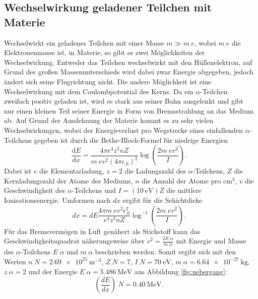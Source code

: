 \subsection{Wechselwirkung geladener Teilchen mit Materie}
\noindent Wechselwirkt ein geladenes Teilchen mit einer Masse $m\gg m_.e$, wobei $m_.e$ die Elektronenmasse ist, in Materie, so gibt es zwei Möglichkeiten der Wechselwirkung.
Entweder das Teilchen wechselwirkt mit den Hüllenelektron, auf Grund des großen Massenunterschieds wird dabei zwar Energie abgegeben, jedoch ändert sich seine Flugrichtung nicht. Die andere Möglichkeit ist eine Wechselwirkung mit dem Coulombpotential des Kerns. Da ein $\alpha$-Teilchen zweifach positiv geladen ist, wird es stark aus seiner Bahn ausgelenkt und gibt nur einen kleinen Teil seiner Energie in Form von Bremsstrahlung an das Medium ab.
Auf Grund der Ausdehnung der Materie kommt es zu sehr vielen Wechselwirkungen, wobei der Energieverlust pro Wegstrecke eines einfallenden $\alpha$-Teilchens gegeben ist durch die Bethe-Bloch-Formel für niedrige Energien
\begin{equation}
\frac{\mathrm{d}E}{\mathrm{d}x}=\frac{4\pi e^4z^2n Z}{m_.ev^2(4\pi\epsilon_.0)^2}\log{\left(\frac{2m_.ev^2}{I}\right)}\text{.}\label{eq:BBF}
\end{equation} 
Dabei ist $e$ die Elementarladung, $z=2$ die Ladungszahl des $\alpha$-Teilchens, $Z$ die Kernladungszahl der Atome des Mediums, $n$ die Anzahl der Atome pro $\si{\centi\meter^3}$, $v$ die Geschwindigkeit des $\alpha$-Teilchens und $I=(\SI{10}{\electronvolt})Z$ die mittlere Ionisationsenergie. Umformen nach $dx$ ergibt für die Schichtdicke
\begin{equation}
dx=dE\frac{4\pi m_.e v^2\epsilon^2_.0}{e^4z^2nZ}\log^{-1}\left(\frac{2m_.e v^2}{I}\right)\text{.}\label{eq:dx}
\end{equation}
Für das Bremsvermögen in Luft genähert als Stickstoff kann das Geschwindigkeitsquadrat näherungsweise über $v^2=\frac{2E_.{\alpha}}{m_.{\alpha}}$ mit Energie und Masse des $\alpha$-Teilchens $E_.{\alpha}$ und $m_.{\alpha}$ beschrieben werden. Somit ergibt sich mit den Werten $n_.N = \SI{2,69e25}{\metre^{-3}}$, $Z_.N=7$, $I_.N=\SI{70}{\electronvolt}$, $m_.{\alpha}=\SI{6,64e-27}{\kilo\gram}$, $z_.{\alpha}=2$ und der Energie $E_.{\alpha}=\SI{5,486}{\mega\electronvolt}$ aus Abbildung \ref{fig:uebergang}:
\begin{equation*}
\left(\frac{dE}{dx}\right)_.{N}=\SI{0,40}{\mega\electronvolt}\text{.}
\end{equation*}

